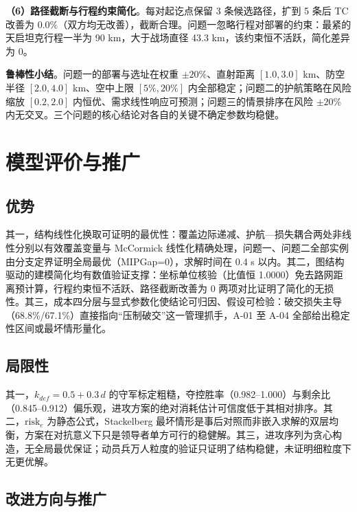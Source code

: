 \documentclass[12pt,a4paper]{ctexart}
\begin{document}
\textbf{（6）路径截断与行程约束简化}。每对起讫点保留 3 条候选路径，扩到 5 条后 TC 改善为 0.0\%（双方均无改善），截断合理。问题一忽略行程对部署的约束：最紧的天启坦克行程一半为 90 km，大于战场直径 43.3 km，该约束恒不活跃，简化差异为 0。

\textbf{鲁棒性小结}。问题一的部署与选址在权重 $\pm20\%$、直射距离 $[1.0,3.0]$ km、防空半径 $[2.0,4.0]$ km、空中上限 $[5\%,20\%]$ 内全部稳定；问题二的护航策略在风险缩放 $[0.2,2.0]$ 内恒优、需求线性响应可预测；问题三的情景排序在风险 $\pm20\%$ 内无交叉。三个问题的核心结论对各自的关键不确定参数均稳健。

\section{模型评价与推广}

\subsection{优势}

其一，结构线性化换取可证明的最优性：覆盖边际递减、护航—损失耦合两处非线性分别以有效覆盖变量与 McCormick 线性化精确处理，问题一、问题二全部实例由分支定界证明全局最优（MIPGap=0），求解时间在 0.4 s 以内。其二，图结构驱动的建模简化均有数值验证支撑：坐标单位核验（比值恒 1.0000）免去路网距离预计算，行程约束恒不活跃、路径截断改善为 0 两项对比证明了简化的无损性。其三，成本四分层与显式参数化使结论可归因、假设可检验：破交损失主导（68.8\%/67.1\%）直接指向“压制破交”这一管理抓手，A-01 至 A-04 全部给出稳定性区间或最坏情形量化。

\subsection{局限性}

其一，$k_{def}=0.5+0.3\,d$ 的守军标定粗糙，夺控胜率（0.982--1.000）与剩余比（0.845--0.912）偏乐观，进攻方案的绝对消耗估计可信度低于其相对排序。其二，$\mathrm{risk}_e$ 为静态公式，Stackelberg 最坏情形是事后对照而非嵌入求解的双层均衡，方案在对抗意义下只是领导者单方可行的稳健解。其三，进攻序列为贪心构造，无全局最优保证；动员兵万人粒度的验证只证明了结构稳健，未证明细粒度下无更优解。

\subsection{改进方向与推广}
\end{document}
